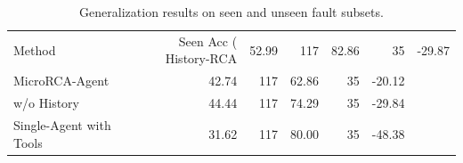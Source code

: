 \begin{table}[t]
\centering
\caption{Generalization results on seen and unseen fault subsets.}
\label{tab:generalization}
\begin{tabular}{lrrrrr}
\toprule
Method & Seen Acc (%
\midrule
History-RCA & 52.99 & 117 & 82.86 & 35 & -29.87 \\
MicroRCA-Agent & 42.74 & 117 & 62.86 & 35 & -20.12 \\
w/o History & 44.44 & 117 & 74.29 & 35 & -29.84 \\
Single-Agent with Tools & 31.62 & 117 & 80.00 & 35 & -48.38 \\
\bottomrule
\end{tabular}
\end{table}
